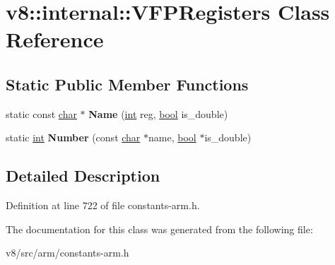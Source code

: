\hypertarget{classv8_1_1internal_1_1VFPRegisters}{}\section{v8\+:\+:internal\+:\+:V\+F\+P\+Registers Class Reference}
\label{classv8_1_1internal_1_1VFPRegisters}
\subsection*{Static Public Member Functions}
\begin{DoxyCompactItemize}
\item 
\mbox{\label{classv8_1_1internal_1_1VFPRegisters_af126a5fda9266f16b81d32710f650de0}} 
static const \mbox{\hyperlink{classchar}{char}} $\ast$ {\bfseries Name} (\mbox{\hyperlink{classint}{int}} reg, \mbox{\hyperlink{classbool}{bool}} is\+\_\+double)
\item 
\mbox{\label{classv8_1_1internal_1_1VFPRegisters_ae0468859bf8d053c051b624527c11a6f}} 
static \mbox{\hyperlink{classint}{int}} {\bfseries Number} (const \mbox{\hyperlink{classchar}{char}} $\ast$name, \mbox{\hyperlink{classbool}{bool}} $\ast$is\+\_\+double)
\end{DoxyCompactItemize}


\subsection{Detailed Description}


Definition at line 722 of file constants-\/arm.\+h.



The documentation for this class was generated from the following file\+:\begin{DoxyCompactItemize}
\item 
v8/src/arm/constants-\/arm.\+h\end{DoxyCompactItemize}
